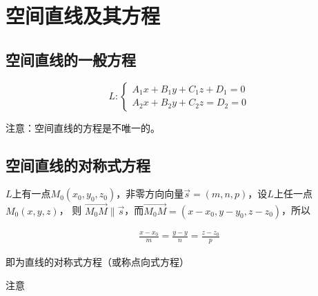 \documentclass[
	11pt, %
	a4paper, %
]{WhuSakuraBook}
\begin{document}
\section{空间直线及其方程}

\subsection{空间直线的一般方程}

    \begin{equation}
        L:\left\{\begin{array}{l}
        A_1 x+B_1 y+C_1 z+D_1=0 \\
        A_2 x+B_2 y+C_2 z=D_2=0
        \end{array}\right.
    \end{equation}

    注意：空间直线的方程是不唯一的。

\subsection{空间直线的对称式方程}

    \(L\)上有一点\(M_0\left(x_0, y_0, z_0\right)\)，非零方向向量\(\overrightarrow{s} =
    \left(m, n, p\right)\)，设\(L\)上任一点\(M_0\left(x, y, z\right)\)，
	则 \(\overrightarrow{M_{0}M} \parallel \overrightarrow{s}\)，而\(\overrightarrow{M_{0}M} =
    \left(x-x_0, y-y_0, z-z_0\right)\)，所以

    \begin{align}
        \frac{x-x_0}{m}=\frac{y-y}{n}=\frac{z-z_0}{p}
    \end{align}

    即为直线的对称式方程（或称点向式方程）
    
    注意
\end{document}
